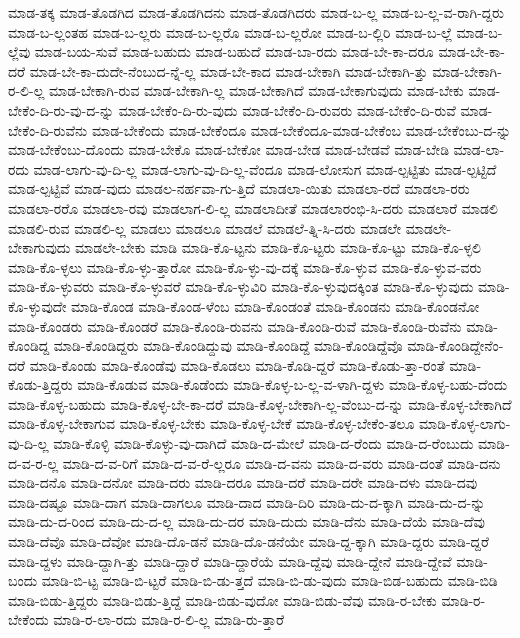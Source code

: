 {ಮಾಡ-ತಕ್ಕ
ಮಾಡ-ತೊಡಗಿದ
ಮಾಡ-ತೊಡಗಿದನು
ಮಾಡ-ತೊಡಗಿದರು
ಮಾಡ-ಬ-ಲ್ಲ
ಮಾಡ-ಬ-ಲ್ಲ-ವ-ರಾಗಿ-ದ್ದರು
ಮಾಡ-ಬ-ಲ್ಲಂತಹ
ಮಾಡ-ಬ-ಲ್ಲರು
ಮಾಡ-ಬ-ಲ್ಲರೊ
ಮಾಡ-ಬ-ಲ್ಲರೋ
ಮಾಡ-ಬ-ಲ್ಲಿರಿ
ಮಾಡ-ಬ-ಲ್ಲೆ
ಮಾಡ-ಬ-ಲ್ಲೆವು
ಮಾಡ-ಬಯ-ಸುವೆ
ಮಾಡ-ಬಹುದು
ಮಾಡ-ಬಹುದೆ
ಮಾಡ-ಬಾ-ರದು
ಮಾಡ-ಬೇ-ಕಾ-ದರೂ
ಮಾಡ-ಬೇ-ಕಾ-ದರೆ
ಮಾಡ-ಬೇ-ಕಾ-ದುದೇ-ನೆಂಬುದ-ನ್ನೆ-ಲ್ಲ
ಮಾಡ-ಬೇ-ಕಾದ
ಮಾಡ-ಬೇಕಾಗಿ
ಮಾಡ-ಬೇಕಾಗಿ-ತ್ತು
ಮಾಡ-ಬೇಕಾಗಿ-ರ-ಲಿ-ಲ್ಲ
ಮಾಡ-ಬೇಕಾಗಿ-ರುವ
ಮಾಡ-ಬೇಕಾಗಿ-ಲ್ಲ
ಮಾಡ-ಬೇಕಾಗಿದೆ
ಮಾಡ-ಬೇಕಾಗುವುದು
ಮಾಡ-ಬೇಕು
ಮಾಡ-ಬೇಕೆಂ-ದಿ-ರು-ವು-ದ-ನ್ನು
ಮಾಡ-ಬೇಕೆಂ-ದಿ-ರು-ವುದು
ಮಾಡ-ಬೇಕೆಂ-ದಿ-ರುವರು
ಮಾಡ-ಬೇಕೆಂ-ದಿ-ರುವೆ
ಮಾಡ-ಬೇಕೆಂ-ದಿ-ರುವೆನು
ಮಾಡ-ಬೇಕೆಂದು
ಮಾಡ-ಬೇಕೆಂದೂ
ಮಾಡ-ಬೇಕೆಂದೂ-ಮಾಡ-ಬೇಕೆಂಬ
ಮಾಡ-ಬೇಕೆಂಬು-ದ-ನ್ನು
ಮಾಡ-ಬೇಕೆಂಬು-ದೊಂದು
ಮಾಡ-ಬೇಕೊ
ಮಾಡ-ಬೇಕೋ
ಮಾಡ-ಬೇಡ
ಮಾಡ-ಬೇಡವೆ
ಮಾಡ-ಬೇಡಿ
ಮಾಡ-ಲಾ-ರದು
ಮಾಡ-ಲಾಗು-ವು-ದಿ-ಲ್ಲ
ಮಾಡ-ಲಾಗು-ವು-ದಿ-ಲ್ಲ-ವೆಂದೂ
ಮಾಡ-ಲೋಸುಗ
ಮಾಡ-ಲ್ಪಟ್ಟಿತು
ಮಾಡ-ಲ್ಪಟ್ಟಿದೆ
ಮಾಡ-ಲ್ಪಟ್ಟಿವೆ
ಮಾಡ-ವುದು
ಮಾಡಲ-ನರ್ಹವಾ-ಗು-ತ್ತಿದೆ
ಮಾಡಲಾ-ಯಿತು
ಮಾಡಲಾ-ರದೆ
ಮಾಡಲಾ-ರರು
ಮಾಡಲಾ-ರರೊ
ಮಾಡಲಾ-ರವು
ಮಾಡಲಾಗ-ಲಿ-ಲ್ಲ
ಮಾಡಲಾದೀತೆ
ಮಾಡಲಾರಂಭಿ-ಸಿ-ದರು
ಮಾಡಲಾರೆ
ಮಾಡಲಿ
ಮಾಡಲಿ-ರುವ
ಮಾಡಲಿ-ಲ್ಲ
ಮಾಡಲು
ಮಾಡಲೂ
ಮಾಡಲೆ
ಮಾಡಲೆ-ತ್ನಿ-ಸಿ-ದರು
ಮಾಡಲೇ
ಮಾಡಲೇ-ಬೇಕಾಗುವುದು
ಮಾಡಲೇ-ಬೇಕು
ಮಾಡಿ
ಮಾಡಿ-ಕೊ-ಟ್ಟನು
ಮಾಡಿ-ಕೊ-ಟ್ಟರು
ಮಾಡಿ-ಕೊ-ಟ್ಟು
ಮಾಡಿ-ಕೊ-ಳ್ಳಲಿ
ಮಾಡಿ-ಕೊ-ಳ್ಳಲು
ಮಾಡಿ-ಕೊ-ಳ್ಳು-ತ್ತಾರೋ
ಮಾಡಿ-ಕೊ-ಳ್ಳು-ವು-ದಕ್ಕೆ
ಮಾಡಿ-ಕೊ-ಳ್ಳುವ
ಮಾಡಿ-ಕೊ-ಳ್ಳುವ-ವರು
ಮಾಡಿ-ಕೊ-ಳ್ಳುವರು
ಮಾಡಿ-ಕೊ-ಳ್ಳುವರೆ
ಮಾಡಿ-ಕೊ-ಳ್ಳುವಿರಿ
ಮಾಡಿ-ಕೊ-ಳ್ಳುವುದಕ್ಕಿಂತ
ಮಾಡಿ-ಕೊ-ಳ್ಳುವುದು
ಮಾಡಿ-ಕೊ-ಳ್ಳುವುದೇ
ಮಾಡಿ-ಕೊಂಡ
ಮಾಡಿ-ಕೊಂಡ-ಳೆಂಬ
ಮಾಡಿ-ಕೊಂಡಂತೆ
ಮಾಡಿ-ಕೊಂಡನು
ಮಾಡಿ-ಕೊಂಡನೋ
ಮಾಡಿ-ಕೊಂಡರು
ಮಾಡಿ-ಕೊಂಡರೆ
ಮಾಡಿ-ಕೊಂಡಿ-ರುವನು
ಮಾಡಿ-ಕೊಂಡಿ-ರುವೆ
ಮಾಡಿ-ಕೊಂಡಿ-ರುವೆನು
ಮಾಡಿ-ಕೊಂಡಿದ್ದ
ಮಾಡಿ-ಕೊಂಡಿದ್ದರು
ಮಾಡಿ-ಕೊಂಡಿದ್ದುವು
ಮಾಡಿ-ಕೊಂಡಿದ್ದೆ
ಮಾಡಿ-ಕೊಂಡಿದ್ದೆವೊ
ಮಾಡಿ-ಕೊಂಡಿದ್ದೇನೆಂ-ದರೆ
ಮಾಡಿ-ಕೊಂಡು
ಮಾಡಿ-ಕೊಂಡೆವು
ಮಾಡಿ-ಕೊಡಲು
ಮಾಡಿ-ಕೊಡಿ-ದ್ದರೆ
ಮಾಡಿ-ಕೊಡು-ತ್ತಾ-ರಂತೆ
ಮಾಡಿ-ಕೊಡು-ತ್ತಿದ್ದರು
ಮಾಡಿ-ಕೊಡುವ
ಮಾಡಿ-ಕೊಡೆಂದು
ಮಾಡಿ-ಕೊಳ್ಳ-ಬ-ಲ್ಲ-ವ-ಳಾಗಿ-ದ್ದಳು
ಮಾಡಿ-ಕೊಳ್ಳ-ಬಹು-ದೆಂದು
ಮಾಡಿ-ಕೊಳ್ಳ-ಬಹುದು
ಮಾಡಿ-ಕೊಳ್ಳ-ಬೇ-ಕಾ-ದರೆ
ಮಾಡಿ-ಕೊಳ್ಳ-ಬೇಕಾಗಿ-ಲ್ಲ-ವೆಂಬು-ದ-ನ್ನು
ಮಾಡಿ-ಕೊಳ್ಳ-ಬೇಕಾಗಿದೆ
ಮಾಡಿ-ಕೊಳ್ಳ-ಬೇಕಾಗುವ
ಮಾಡಿ-ಕೊಳ್ಳ-ಬೇಕು
ಮಾಡಿ-ಕೊಳ್ಳ-ಬೇಕೆ
ಮಾಡಿ-ಕೊಳ್ಳ-ಬೇಕೆಂ-ತಲೂ
ಮಾಡಿ-ಕೊಳ್ಳ-ಲಾಗು-ವು-ದಿ-ಲ್ಲ
ಮಾಡಿ-ಕೊಳ್ಳಿ
ಮಾಡಿ-ಕೊಳ್ಳು-ವು-ದಾಗಿದೆ
ಮಾಡಿ-ದ-ಮೇಲೆ
ಮಾಡಿ-ದ-ರೆಂದು
ಮಾಡಿ-ದ-ರೆಂಬುದು
ಮಾಡಿ-ದ-ವ-ರ-ಲ್ಲ
ಮಾಡಿ-ದ-ವ-ರಿಗೆ
ಮಾಡಿ-ದ-ವ-ರೆ-ಲ್ಲರೂ
ಮಾಡಿ-ದ-ವನು
ಮಾಡಿ-ದ-ವರು
ಮಾಡಿ-ದಂತೆ
ಮಾಡಿ-ದನು
ಮಾಡಿ-ದನೊ
ಮಾಡಿ-ದನೋ
ಮಾಡಿ-ದರು
ಮಾಡಿ-ದರೂ
ಮಾಡಿ-ದರೆ
ಮಾಡಿ-ದರೇ
ಮಾಡಿ-ದಳು
ಮಾಡಿ-ದವು
ಮಾಡಿ-ದಷ್ಟೂ
ಮಾಡಿ-ದಾಗ
ಮಾಡಿ-ದಾಗಲೂ
ಮಾಡಿ-ದಾದ
ಮಾಡಿ-ದಿರಿ
ಮಾಡಿ-ದು-ದ-ಕ್ಕಾಗಿ
ಮಾಡಿ-ದು-ದ-ನ್ನು
ಮಾಡಿ-ದು-ದ-ರಿಂದ
ಮಾಡಿ-ದು-ದ-ಲ್ಲ
ಮಾಡಿ-ದು-ದರ
ಮಾಡಿ-ದುದು
ಮಾಡಿ-ದೆನು
ಮಾಡಿ-ದೆಯೆ
ಮಾಡಿ-ದೆವು
ಮಾಡಿ-ದೆವೊ
ಮಾಡಿ-ದೆವೋ
ಮಾಡಿ-ದೊ-ಡನೆ
ಮಾಡಿ-ದೊ-ಡನೆಯೇ
ಮಾಡಿ-ದ್ದ-ಕ್ಕಾಗಿ
ಮಾಡಿ-ದ್ದರು
ಮಾಡಿ-ದ್ದರೆ
ಮಾಡಿ-ದ್ದಳು
ಮಾಡಿ-ದ್ದಾಗಿ-ತ್ತು
ಮಾಡಿ-ದ್ದಾರೆ
ಮಾಡಿ-ದ್ದಾರೆಯೆ
ಮಾಡಿ-ದ್ದೆವು
ಮಾಡಿ-ದ್ದೇನೆ
ಮಾಡಿ-ದ್ದೇವೆ
ಮಾಡಿ-ಬಂದು
ಮಾಡಿ-ಬಿ-ಟ್ಟ
ಮಾಡಿ-ಬಿ-ಟ್ಟರೆ
ಮಾಡಿ-ಬಿ-ಡು-ತ್ತದೆ
ಮಾಡಿ-ಬಿ-ಡು-ವುದು
ಮಾಡಿ-ಬಿಡ-ಬಹುದು
ಮಾಡಿ-ಬಿಡಿ
ಮಾಡಿ-ಬಿಡು-ತ್ತಿದ್ದರು
ಮಾಡಿ-ಬಿಡು-ತ್ತಿದ್ದೆ
ಮಾಡಿ-ಬಿಡು-ವುದೋ
ಮಾಡಿ-ಬಿಡು-ವೆವು
ಮಾಡಿ-ರ-ಬೇಕು
ಮಾಡಿ-ರ-ಬೇಕೆಂದು
ಮಾಡಿ-ರ-ಲಾ-ರದು
ಮಾಡಿ-ರ-ಲಿ-ಲ್ಲ
ಮಾಡಿ-ರು-ತ್ತಾರೆ
}
